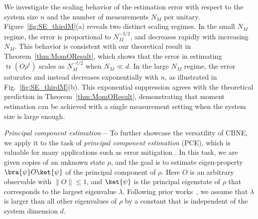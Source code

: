 \documentclass[aps,prl,twocolumn,nofootinbib,superscriptaddress,10pt]{revtex4-2}
\DeclareMathOperator{\Tr}{tr}
\theoremstyle{plain}
\theoremstyle{definition}
\newcommand{\tref}[1]{Theorem~\ref{#1}}
\begin{document}
We investigate the scaling behavior of the estimation error with respect to the system size $n$ and the number of measurements $N_M$ per unitary. 
Figure~\ref{fig:SE_thirdM}(a) reveals two distinct scaling regimes. 
In the small $N_M$ regime, the error is proportional to $N_M^{-3/2}$, and decreases rapidly with increasing $N_M$. 
This behavior is consistent with our theoretical result in \tref{thm:MomOResult}, which shows that the error in estimating $\Tr(O\rho^t)$ scales as $N_M^{-t/2}$ when $N_M\ll d$. 
In the large $N_M$ regime, the error saturates and instead %
decreases exponentially 
with $n$, as illustrated in Fig.~\ref{fig:SE_thirdM}(b). 
This exponential suppression agrees with the theoretical prediction in \tref{thm:MomOResult}, 
demonstrating that moment estimation can be achieved with a single measurement setting when the system size is large enough. 



\emph{Principal component estimation}---  
To further showcase the versatility of CBNE, we apply it to the task of \emph{principal component estimation} (PCE), 
which is valuable for many applications such as error mitigation 
\cite{PhysRevX.11.041036,PhysRevX.11.031057,RevModPhys.95.045005,PRXQuantum.4.010303,o2023purification,PhysRevLett.133.080601}. 
In this task, we are given copies of an unknown  state $\rho$, 
and the goal is to estimate eigen-property $\bra{\psi}O\ket{\psi}$ of the principal component of $\rho$.  
Here $O$ is an arbitrary observable with $\|O\|\leq 1$, and $\ket{\psi}$ is the principal eigenstate of $\rho$ that corresponds to the largest eigenvalue $\lambda$. %
Following prior works~\cite{huang2022quantum,grier2024principal}, we assume that
$\lambda$ is larger than all other eigenvalues of $\rho$ by a constant that is independent of the system dimension $d$.

\end{document}
